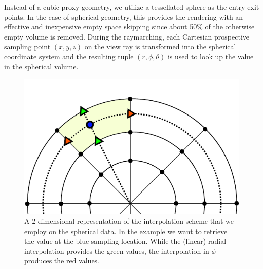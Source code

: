 \documentclass[journal]{vgtc}                %
\begin{document}
Instead of a cubic proxy geometry, we utilize a tessellated sphere as the entry-exit points. In the case of spherical geometry, this provides the rendering with an effective  and inexpensive empty space skipping since about 50\% of the otherwise empty volume is removed. During the raymarching, each Cartesian prospective sampling point $(x,y,z)$ on the view ray is transformed into the spherical coordinate system and the resulting tuple $(r, \phi, \theta)$ is used to look up the value in the spherical volume.

\begin{figure}[b!]
\newcommand{\abImageWidth}{0.75\columnwidth}
\centering
\includegraphics[width=\abImageWidth]{figures/spherical_interpolation.pdf}
\caption{A 2-dimensional representation of the interpolation scheme that we employ on the spherical data. In the example we want to retrieve the value at the blue sampling location. While the (linear) radial interpolation provides the green values, the interpolation in $\phi$ produces the red values.}
\label{fig:sphericalvolume}
\end{figure}
\end{document}
